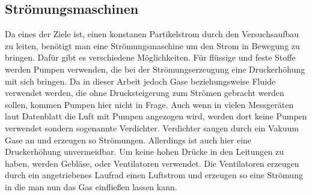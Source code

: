 \subsection{Str\"{o}mungsmaschinen}
Da eines der Ziele ist, einen konstanen Partikelstrom durch den Versuchsaufbau zu leiten, ben\"{o}tigt man eine Str\"{o}mungsmaschine um den Strom in Bewegung zu bringen. Daf\"{u}r gibt es verschiedene M\"{o}glichkeiten. F\"{u}r fl\"{u}ssige und feste Stoffe werden Pumpen verwenden, die bei der Str\"{o}mungserzeugung eine Druckerh\"{o}hung mit sich bringen. Da in dieser Arbeit jedoch Gase beziehungsweise Fluide verwendet werden, die ohne Drucksteigerung zum Str\"{o}men gebracht werden sollen, kommen Pumpen hier nicht in Frage. Auch wenn in vielen Messger\"{a}ten laut Datenblatt die Luft mit Pumpen angezogen wird, werden dort keine Pumpen verwendet sondern sogenannte Verdichter. Verdichter saugen durch ein Vakuum Gase an und erzeugen so Str\"{o}mungen. Allerdings ist auch hier eine Druckerh\"{o}hung unvermeidbar. Um keine hohen Dr\"{u}cke in den Leitungen zu haben, werden Gebl\"{a}se, oder Ventilatoren verwendet. Die Ventilatoren erzeugen durch ein angetriebenes Laufrad einen Luftstrom und erzeugen so eine Str\"{o}mung in die man nun das Gas einflie{\ss}en lassen kann.